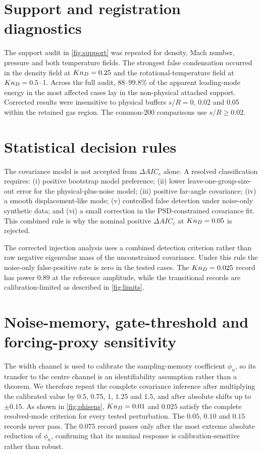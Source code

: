 \appendix
\section{Support and registration diagnostics}
The support audit in \cref{fig:support} was repeated for density, Mach number, pressure and both temperature fields. The strongest false condensation occurred in the density field at $Kn_D=0.25$ and the rotational-temperature field at $Kn_D=0.5$--1. Across the full audit, 88--99.8\% of the apparent leading-mode energy in the most affected cases lay in the non-physical attached support. Corrected results were insensitive to physical buffers $s/R=0$, 0.02 and 0.05 within the retained gas region. The common-200 comparisons use $s/R\geq0.02$.

\section{Statistical decision rules}
The covariance model is not accepted from $\Delta AIC_c$ alone. A resolved classification requires: (i) positive bootstrap model preference; (ii) lower leave-one-group-size-out error for the physical-plus-noise model; (iii) positive far-angle covariance; (iv) a smooth displacement-like mode; (v) controlled false detection under noise-only synthetic data; and (vi) a small correction in the PSD-constrained covariance fit. This combined rule is why the nominal positive $\Delta AIC_c$ at $Kn_D=0.05$ is rejected.

The corrected injection analysis uses a combined detection criterion rather than raw negative eigenvalue mass of the unconstrained covariance. Under this rule the noise-only false-positive rate is zero in the tested cases. The $Kn_D=0.025$ record has power 0.89 at the reference amplitude, while the transitional records are calibration-limited as described in \cref{fig:limits}.

\section{Noise-memory, gate-threshold and forcing-proxy sensitivity}
The width channel is used to calibrate the sampling-memory coefficient $\phi_n$, so its transfer to the centre channel is an identifiability assumption rather than a theorem. We therefore repeat the complete covariance inference after multiplying the calibrated value by $0.5$, $0.75$, $1$, $1.25$ and $1.5$, and after absolute shifts up to $\pm0.15$. As shown in \cref{fig:phisens}, $Kn_D=0.01$ and $0.025$ satisfy the complete resolved-mode criterion for every tested perturbation. The $0.05$, $0.10$ and $0.15$ records never pass. The $0.075$ record passes only after the most extreme absolute reduction of $\phi_n$, confirming that its nominal response is calibration-sensitive rather than robust.

